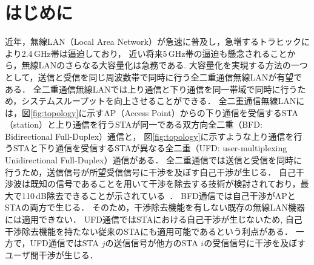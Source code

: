 \documentclass[technicalreport]{ieicej}
\begin{document}

\maketitle

\renewcommand{\baselinestretch}{0.99}\selectfont

\section{はじめに}
	近年，無線LAN（Local Area Network）が急速に普及し，急増するトラヒックにより2.4\,GHz帯は逼迫しており，
	近い将来5\,GHz帯の逼迫も懸念されることから，無線LANのさらなる大容量化は急務である.
	大容量化を実現する方法の一つとして，送信と受信を同じ周波数帯で同時に行う全二重通信無線LANが有望である．
	全二重通信無線LANでは上り通信と下り通信を同一帯域で同時に行うため，システムスループットを向上させることができる．
	全二重通信無線LANには，図\ref{fig:topology}に示すAP（Access Point）からの下り通信を受信するSTA（station）と上り通信を行うSTAが同一である双方向全二重（BFD: Bidirectional Full-Duplex）通信と，
	図\ref{fig:topology}に示すような上り通信を行うSTAと下り通信を受信するSTAが異なる全二重（UFD: user-multiplexing Unidirectional Full-Duplex）通信がある．
	全二重通信では送信と受信を同時に行うため，送信信号が所望受信信号に干渉を及ぼす自己干渉が生じる．
	自己干渉波は既知の信号であることを用いて干渉を除去する技術が検討されており，最大で110\,dB除去できることが示されている~\cite{fdmac, stanford1}．
	BFD通信では自己干渉がAPとSTAの両方で生じる．
	そのため，干渉除去機能を有しない既存の無線LAN機器には適用できない．
	UFD通信ではSTAにおける自己干渉が生じないため, 自己干渉除去機能を持たない従来のSTAにも適用可能であるという利点がある．
	一方で，UFD通信ではSTA $j$の送信信号が他方のSTA $i$の受信信号に干渉を及ぼすユーザ間干渉が生じる．
\end{document}
